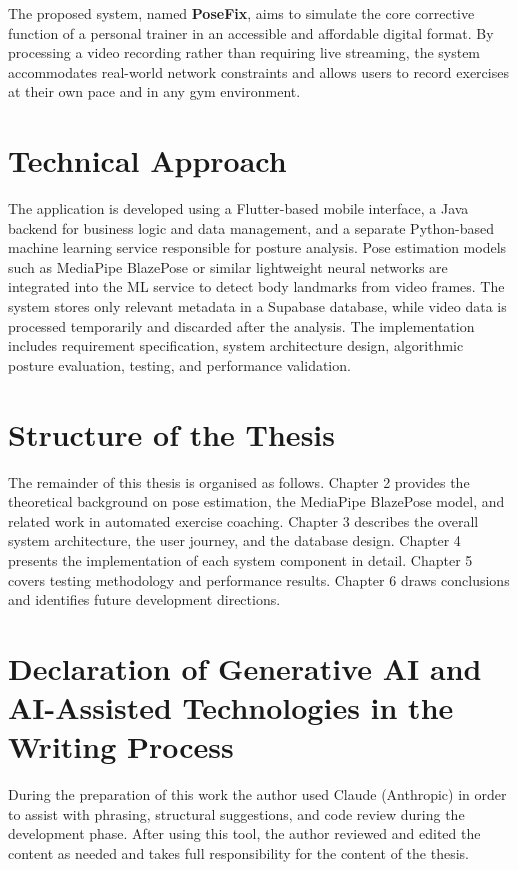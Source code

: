 The proposed system, named \textbf{PoseFix}, aims to simulate the core corrective function of a personal trainer in an accessible and affordable digital format. By processing a video recording rather than requiring live streaming, the system accommodates real-world network constraints and allows users to record exercises at their own pace and in any gym environment.

\section{Technical Approach}
\label{sec:approach}

The application is developed using a Flutter-based mobile interface, a Java backend for business logic and data management, and a separate Python-based machine learning service responsible for posture analysis. Pose estimation models such as MediaPipe BlazePose \cite{Tetreault2016} or similar lightweight neural networks are integrated into the ML service to detect body landmarks from video frames. The system stores only relevant metadata in a Supabase database, while video data is processed temporarily and discarded after the analysis. The implementation includes requirement specification, system architecture design, algorithmic posture evaluation, testing, and performance validation.

\section{Structure of the Thesis}
\label{sec:structure}

The remainder of this thesis is organised as follows. Chapter 2 provides the theoretical background on pose estimation, the MediaPipe BlazePose model, and related work in automated exercise coaching. Chapter 3 describes the overall system architecture, the user journey, and the database design. Chapter 4 presents the implementation of each system component in detail. Chapter 5 covers testing methodology and performance results. Chapter 6 draws conclusions and identifies future development directions.

\section{Declaration of Generative AI and AI-Assisted Technologies in the Writing Process}
\label{sec:ai-declaration}

During the preparation of this work the author used Claude (Anthropic) in order to assist with phrasing, structural suggestions, and code review during the development phase. After using this tool, the author reviewed and edited the content as needed and takes full responsibility for the content of the thesis.
